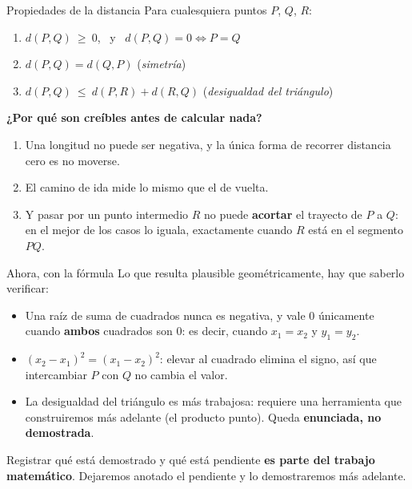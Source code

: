 \documentclass[aspectratio=169,10pt]{beamer}
\newcommand{\destaca}[1]{%
  \par\vspace{3pt}\noindent
  \colorbox{turquesaClaro}{%
    \parbox{\dimexpr\linewidth-2\fboxsep\relax}{\vspace{3pt}#1\vspace{3pt}}}%
  \par\vspace{3pt}}
\begin{document}
\begin{frame}{Propiedades de la distancia}
  Para cualesquiera puntos $P$, $Q$, $R$:

  \vspace{0.2cm}
  \begin{enumerate}
    \item $d(P,Q)\ \ge\ 0$, \ y \ $d(P,Q)=0 \iff P=Q$
    \item $d(P,Q)=d(Q,P)$ \hfill (\textit{simetría})
    \item $d(P,Q)\ \le\ d(P,R)+d(R,Q)$ \hfill (\textit{desigualdad del triángulo})
  \end{enumerate}

  \vspace{0.4cm}
  \destaca{\textbf{¿Por qué son creíbles antes de calcular nada?}
  \begin{enumerate}
  \item Una longitud no puede ser negativa, y la única forma de recorrer
  distancia cero es no moverse.
  \item El camino de ida mide lo mismo que el
  de vuelta. 
  \item Y pasar por un punto intermedio $R$ no puede
  \textbf{acortar} el trayecto de $P$ a $Q$: en el mejor de los casos lo
  iguala, exactamente cuando $R$ está en el segmento $PQ$.
  \end{enumerate}}
\end{frame}
\begin{frame}{Ahora, con la fórmula}
  Lo que resulta plausible geométricamente, hay que saberlo verificar:

  \vspace{0.2cm}
  \begin{itemize}
    \item[1.] Una raíz de suma de cuadrados nunca es negativa, y vale
      $0$ únicamente cuando \textbf{ambos} cuadrados son $0$: es decir,
      cuando $x_1=x_2$ y $y_1=y_2$.
    \item[2.] $(x_2-x_1)^2=(x_1-x_2)^2$: elevar al cuadrado elimina el
      signo, así que intercambiar $P$ con $Q$ no cambia el valor.
    \item[3.] La desigualdad del triángulo es más trabajosa: requiere
      una herramienta que construiremos más adelante (el producto punto).
      Queda \textbf{enunciada, no demostrada}.
  \end{itemize}

  \vspace{0.4cm}
  \destaca{Registrar qué está demostrado y qué está pendiente
  \textbf{es parte del trabajo matemático}. Dejaremos anotado el
  pendiente y lo demostraremos más adelante.}
\end{frame}
\end{document}

